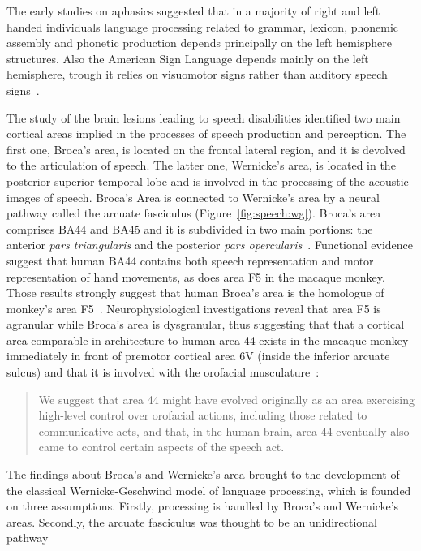The early studies on aphasics suggested that in a majority of right and left
handed individuals language processing related to grammar, lexicon, phonemic
assembly and phonetic production depends principally on the left
hemisphere structures.
Also the American Sign Language depends mainly on the left hemisphere, trough it
relies on visuomotor signs rather than auditory speech
signs~\citep{kandel.schwartz.jessel:2000}.


The study of the brain lesions leading to speech disabilities identified two
main cortical areas implied in the processes of speech production and
perception.
The first one, Broca's area, is located on the frontal lateral region, and it
is devolved to the articulation of speech.
The latter one, Wernicke's area, is located in the posterior superior temporal
lobe and is involved in the processing of the acoustic images of speech.
Broca's Area is connected to Wernicke's area by a neural pathway called the 
arcuate fasciculus (Figure~\ref{fig:speech:wg}).
Broca's area comprises BA44 and BA45 and it is subdivided in two main portions:
the anterior \emph{pars triangularis} and the
posterior \emph{pars opercularis}~\citep{kandel.schwartz.jessel:2000}.
Functional evidence suggest that human BA44 contains both speech representation
and motor representation of hand movements, as does area F5 in the macaque 
monkey. 
Those results strongly suggest that human Broca's area is the homologue of
monkey's area F5~\citep{rizzolatti.craighero:2004}.
Neurophysiological investigations reveal that area F5 is agranular while Broca's
area is dysgranular, 
thus suggesting that that a cortical area comparable
in architecture to human area 44 exists in the macaque monkey immediately in 
front of premotor cortical area 6V (inside the inferior arcuate sulcus) and
that it is involved with the orofacial musculature~\citep{petrides.etal:2005}:
\begin{quote}
We suggest that area 44 might have evolved originally as an area exercising 
high-level control over orofacial actions, including those related to 
communicative acts, and that, in the human brain, area 44 eventually also came 
to control certain aspects of the speech act.
\end{quote}
The findings about Broca's and Wernicke's area brought to the development of the
classical Wernicke-Geschwind model of language processing, which is founded on 
three assumptions. 
Firstly, processing is handled by Broca's and Wernicke's areas. 
Secondly, the arcuate fasciculus was thought to be an unidirectional pathway

